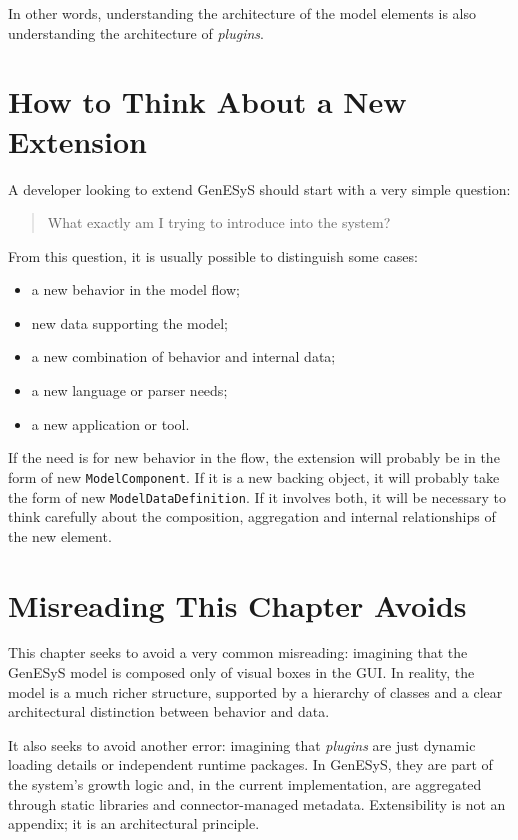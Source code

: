 In other words, understanding the architecture of the model elements is also understanding the architecture of \textit{plugins}.

\section{How to Think About a New Extension}
\label{sec:cap8_como_pensar_nova_extensao}

A developer looking to extend GenESyS should start with a very simple question:
\begin{quote}
 What exactly am I trying to introduce into the system?
\end{quote}

From this question, it is usually possible to distinguish some cases:

\begin{itemize}
 \item a new behavior in the model flow;
 \item new data supporting the model;
 \item a new combination of behavior and internal data;
 \item a new language or parser needs;
 \item a new application or tool.
\end{itemize}

If the need is for new behavior in the flow, the extension will probably be in the form of new \texttt{ModelComponent}. If it is a new backing object, it will probably take the form of new \texttt{ModelDataDefinition}. If it involves both, it will be necessary to think carefully about the composition, aggregation and internal relationships of the new element.

\section{Misreading This Chapter Avoids}
\label{sec:cap8_leitura_errada_evita}

This chapter seeks to avoid a very common misreading: imagining that the GenESyS model is composed only of visual boxes in the GUI. In reality, the model is a much richer structure, supported by a hierarchy of classes and a clear architectural distinction between behavior and data.

It also seeks to avoid another error: imagining that \textit{plugins} are just dynamic loading details or independent runtime packages. In GenESyS, they are part of the system's growth logic and, in the current implementation, are aggregated through static libraries and connector-managed metadata. Extensibility is not an appendix; it is an architectural principle.

